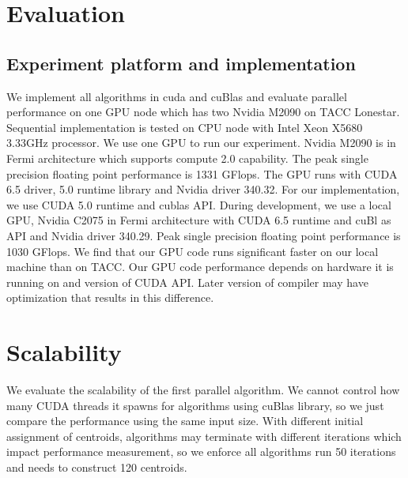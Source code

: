\section{Evaluation}
\subsection{Experiment platform and implementation}
We implement all algorithms in cuda and cuBlas and evaluate parallel performance on one GPU node which
has two Nvidia M2090 on TACC Lonestar. Sequential implementation is tested on CPU node with
Intel Xeon X5680 3.33GHz processor. We use one GPU to run our experiment. Nvidia M2090 is in Fermi
architecture which supports compute 2.0 capability. The peak single precision floating point performance
is 1331 GFlops. The GPU runs with CUDA 6.5 driver, 5.0
runtime library and Nvidia driver 340.32. For our implementation, we use CUDA 5.0 runtime and cublas API.
During development, we use a local GPU, Nvidia C2075 in Fermi architecture with CUDA 6.5 runtime and cuBl
as API and Nvidia driver 340.29. Peak single precision floating point performance is 1030 GFlops.
We find that our GPU code runs significant faster on our local machine than on TACC. Our GPU code
performance depends on hardware it is running on and version of CUDA API. Later version of compiler may
have optimization that results in this difference. 

\section{Scalability}
We evaluate the scalability of the first parallel algorithm. We cannot control how many CUDA threads it
spawns for algorithms using cuBlas library, so we just compare the performance using the same input size.
With different initial assignment of centroids, algorithms may terminate with different iterations which
impact performance measurement, so we enforce all algorithms run 50 iterations and needs to construct
120 centroids. 


